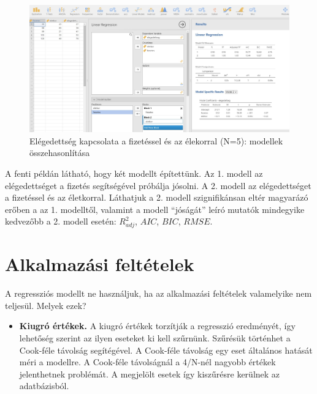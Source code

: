 \documentclass[
  letterpaper,
]{krantz}
\providecommand{\tightlist}{%
  \setlength{\itemsep}{0pt}\setlength{\parskip}{0pt}}\usepackage{longtable,booktabs,array}
\begin{document}
\begin{figure}

{\centering \includegraphics{./images/lin_reg_fizetes_eletkor_elegedettseg_01_kep_05.jpg}

}

\caption{Elégedettség kapcsolata a fizetéssel és az élekorral (N=5):
modellek összehasonlítása}

\end{figure}

A fenti példán látható, hogy két modellt építettünk. Az 1. modell az
elégedettséget a fizetés segítségével próbálja jósolni. A 2. modell az
elégedettséget a fizetéssel és az életkorral. Láthatjuk a 2. modell
szignifikánsan eltér magyarázó erőben a az 1. modelltől, valamint a
modell ``jóságát'' leíró mutatók mindegyike kedvezőbb a 2. modell
esetén: \(R_{adj}^2\), \(AIC\), \(BIC\), \(RMSE\).

\hypertarget{alkalmazuxe1si-feltuxe9telek}{%
\section{Alkalmazási feltételek}\label{alkalmazuxe1si-feltuxe9telek}}

A regressziós modellt ne használjuk, ha az alkalmazási feltételek
valamelyike nem teljesül. Melyek ezek?

\begin{itemize}
\tightlist
\item
  \textbf{Kiugró értékek.} A kiugró értékek torzítják a regresszió
  eredményét, így lehetőség szerint az ilyen eseteket ki kell szűrnünk.
  Szűrésük történhet a Cook-féle távolság segítégével. A Cook-féle
  távolság egy eset általános hatását méri a modellre. A Cook-féle
  távolságnál a 4/N-nél nagyobb értékek jelenthetnek problémát. A
  megjelölt esetek így kiszűrésre kerülnek az adatbázisból.
\end{itemize}
\end{document}
